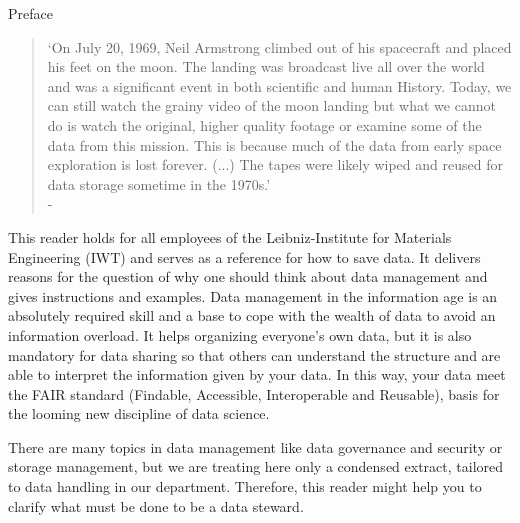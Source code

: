 \thispagestyle{empty}
\begin{center}
  \large\headerfont{}\textcolor{iwtdark}{Preface}
\end{center}

\begin{quote}
  `On July 20, 1969, Neil Armstrong climbed out of his spacecraft and
  placed his feet on the moon. The landing was broadcast live all over the
  world and was a significant event in both scientific and human History.
  Today, we can still watch the grainy video of the moon landing but what we
  cannot do is watch the original, higher quality footage or examine some of
  the data from this mission. This is because much of the data from early space
  exploration is lost forever. (...) The tapes were likely wiped and reused for
  data storage sometime in the 1970s.' \\
  \null\hfill - \citeauthor{briney2015}\cite{briney2015}
\end{quote}

\noindent This reader holds for all employees of the Leibniz-Institute for Materials Engineering (IWT) and serves as a reference
for how to save data. It delivers reasons for the question of why one should
think about data management and gives instructions and examples. Data management
in the information age is an absolutely required skill and a base to cope with
the wealth of data to avoid an information overload. It helps organizing
everyone’s own data, but it is also mandatory for data sharing so that others
can understand the structure and are able to interpret the information given by
your data. In this way, your data meet the FAIR standard (Findable, Accessible,
Interoperable and Reusable), basis for the looming new discipline of data science.

There are many topics in data management like data governance and security or
storage management, but we are treating here only a condensed extract, tailored
to data handling in our department. Therefore, this reader might help you to
clarify what must be done to be a data steward.
